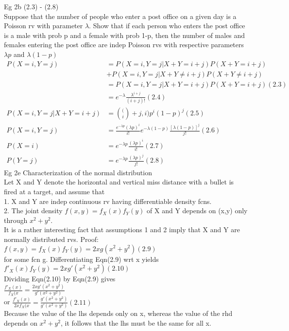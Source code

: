 \documentclass{article}
\begin{document}
Eg 2b (2.3) - (2.8) \\
Suppose that the number of people who enter a post office on a given day is a Poisson rv with parameter $\lambda$. Show that if each person who enters the post office is a male with prob p and a female with prob 1-p, then the number of males and females entering the post office are indep Poisson rvs with respective parameters $\lambda p$ and $\lambda (1-p)$ \\ 
\begin{align*}
    P(X = i, Y =j)  &= P(X = i, Y =j | X + Y = i + j)P(X + Y = i + j) \\              &+ P(X = i, Y =j | X + Y \neq i + j)P(X + Y \neq i + j) \\ 
                    &= P(X = i, Y =j | X + Y = i + j)P(X + Y = i + j) (2.3) \\
                    &= e^{-\lambda}\frac{\lambda^{i+j}}{(i+j)!} (2.4) \\
     P(X = i, Y =j | X + Y = i + j) &= \binom(i+j,i)p^i(1-p)^j (2.5) \\
     P(X = i, Y =j) &= \frac{e^{-\lambda p}(\lambda p)^i}{i!}e^{-\lambda (1-p)}\frac{[\lambda(1-p)]^j}{j!} (2.6) \\
     P(X=i)         &= e^{-\lambda p}\frac{(\lambda p)^i}{i!} (2.7) \\
     P(Y=j)         &= e^{-\lambda p}\frac{(\lambda p)^j}{j!} (2.8)
\end{align*}
Eg 2e Characterization of the normal distribution \\
Let X and Y denote the horizontal and vertical miss distance with a bullet is fired at a target, and assume that \\
1. X and Y are indep continuous rv having differentiable density fcns. \\
2. The joint density $f(x,y)=f_X(x)f_Y(y)$ of X and Y depends on (x,y) only through $x^2 + y^2$.\\
It is a rather interesting fact that assumptions 1 and 2 imply that X and Y are normally distributed rvs. Proof:\\ 
$f(x,y)=f_X(x)f_Y(y)=2xg(x^2 + y^2)(2.9)$ \\
for some fcn g. Differentiating Eqn(2.9) wrt x yields \\
$f'_X(x)f_Y(y)=2xg'(x^2 + y^2) (2.10)$\\
Dividing Eqn(2.10) by Eqn(2.9) gives \\
$\frac{f'_X(x)}{f_X(x} = \frac{2xg'(x^2 + y^2)}{g'(x^2 + y^2)}$\\
or $\frac{f'_X(x)}{2xf_X(x} = \frac{g'(x^2 + y^2)}{g'(x^2 + y^2)}(2.11)$\\
Because the value of the lhs depends only on x, whereas the value of the rhd depends on $x^2 + y^2$, it follows that the lhs must be the same for all x.


\end{document}
